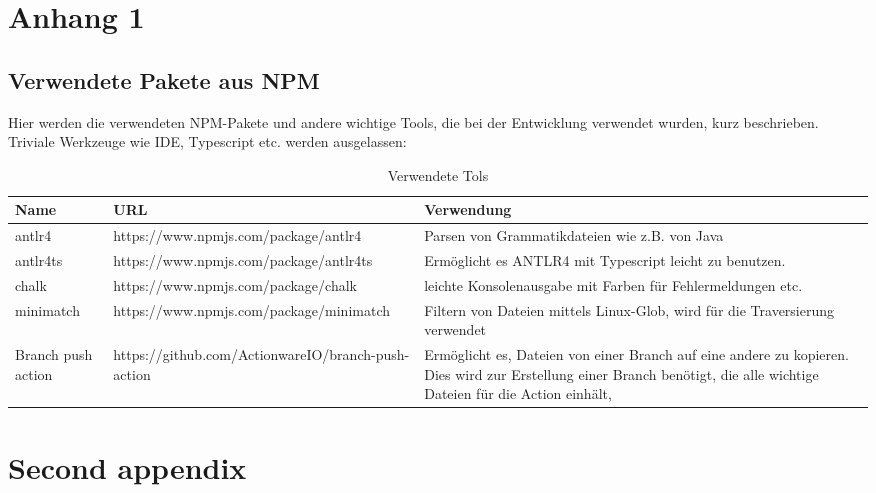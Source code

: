
\begin{appendices}


\chapter{Anhang 1}
\section{Verwendete Pakete aus NPM}
Hier werden die verwendeten NPM-Pakete und andere wichtige Tools, die bei der Entwicklung verwendet wurden, kurz beschrieben. Triviale Werkzeuge wie IDE, Typescript etc. werden ausgelassen:
\begin{table}[h]
    \centering
    \begin{tabular}{m{2cm}|m{8cm}|m{7.0cm}}
       Name  & URL & Verwendung  \\
       \hline
        antlr4 & https://www.npmjs.com/package/antlr4 & Parsen von Grammatikdateien wie z.B. von Java\\
        \hline
        antlr4ts & https://www.npmjs.com/package/antlr4ts & Ermöglicht es ANTLR4 mit Typescript leicht zu benutzen. \\\hline
        chalk & https://www.npmjs.com/package/chalk & leichte Konsolenausgabe mit Farben für Fehlermeldungen etc. \\\hline
        minimatch & https://www.npmjs.com/package/minimatch & Filtern von Dateien mittels  Linux-Glob, wird für die Traversierung verwendet\\\hline
        Branch push action & https://github.com/ActionwareIO/branch-push-action & Ermöglicht es, Dateien von einer Branch auf eine andere zu kopieren. Dies wird zur Erstellung einer Branch benötigt, die alle wichtige Dateien für die Action einhält,
    \end{tabular}
    \caption{Verwendete Tols}
    \label{tab:used_tools}
\end{table}





\chapter{Second appendix}
\label{app:second}


\end{appendices}
	
